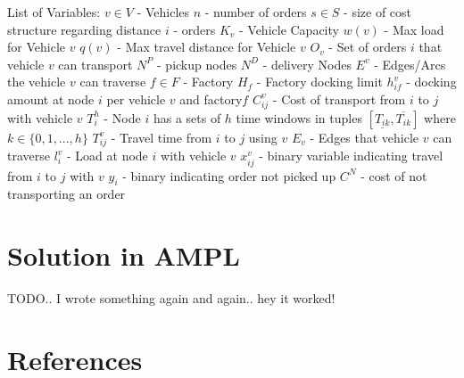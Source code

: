\documentclass[a4paper,12pt]{article}
\begin{document}
List of Variables: \newline
$v \in V$ - Vehicles \newline
$n$ - number of orders\newline
$s \in S$ - size of cost structure regarding distance \newline
$i$ - orders\newline
$K_v$ - Vehicle Capacity \newline
$w(v)$ - Max load for Vehicle $v$ \newline
$q(v)$ - Max travel distance for Vehicle $v$ \newline
$O_v$ - Set of orders $i$ that vehicle $v$ can transport \newline
$N^P$ - pickup nodes\newline
$N^D$ - delivery Nodes\newline
$E^v$ - Edges/Arcs the vehicle $v$ can traverse
$f \in F$ - Factory\newline
$H_f$ - Factory docking limit\newline
$h_{if}^v$ - docking amount at node $i$ per vehicle $v$ and factory$f$ \newline
$C_{ij}^{v}$ - Cost of transport from $i$ to $j$ with vehicle $v$ \newline
$T_i^h$ - Node $i$ has a sets of $h$ time windows in tuples $[ \underline{T_{ik}},  \overline{T_{ik}} ]$ where $k \in \{0,1,...,h\}$  \newline
$T_{ij}^v$ - Travel time from $i$ to $j$ using $v$
$E_v$ - Edges that vehicle $v$ can traverse \newline
$l_{i}^v$ - Load at node $i$ with vehicle $v$ \newline
$x_{ij}^v$ - binary variable indicating travel from $i$ to $j$ with $v$ \newline
$y_i$ - binary indicating order not picked up \newline
$C^N$ - cost of not transporting an order \newline

\section{Solution in AMPL}
TODO.. I wrote something again and again.. hey it worked!

\section{References} \label{sec:Ref}
\end{document}
